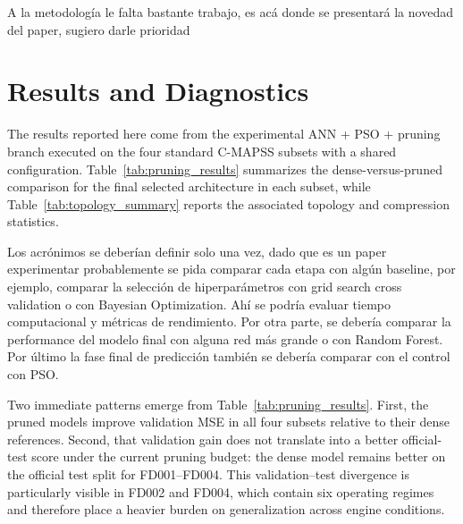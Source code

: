 \documentclass[12pt, a4paper]{article}
\begin{document}

\color{red} A la metodología le falta bastante trabajo, es acá donde se presentará la novedad del paper, sugiero darle prioridad \color{black}

\section{Results and Diagnostics}

The results reported here come from the experimental ANN + PSO + pruning branch executed on the four standard C-MAPSS subsets with a shared configuration. Table~\ref{tab:pruning_results} summarizes the dense-versus-pruned comparison for the final selected architecture in each subset, while Table~\ref{tab:topology_summary} reports the associated topology and compression statistics.

\color{red} Los acrónimos se deberían definir solo una vez, dado que es un paper experimentar probablemente se pida comparar cada etapa con algún baseline, por ejemplo, comparar la selección de hiperparámetros con grid search cross validation o con Bayesian Optimization. Ahí se podría evaluar tiempo computacional y métricas de rendimiento. Por otra parte, se debería comparar la performance del modelo final con alguna red más grande o con Random Forest. Por último la fase final de predicción también se debería comparar con el control con PSO. \color{black}





Two immediate patterns emerge from Table~\ref{tab:pruning_results}. First, the pruned models improve validation MSE in all four subsets relative to their dense references. Second, that validation gain does not translate into a better official-test score under the current pruning budget: the dense model remains better on the official test split for FD001--FD004. This validation--test divergence is particularly visible in FD002 and FD004, which contain six operating regimes and therefore place a heavier burden on generalization across engine conditions.
\end{document}

